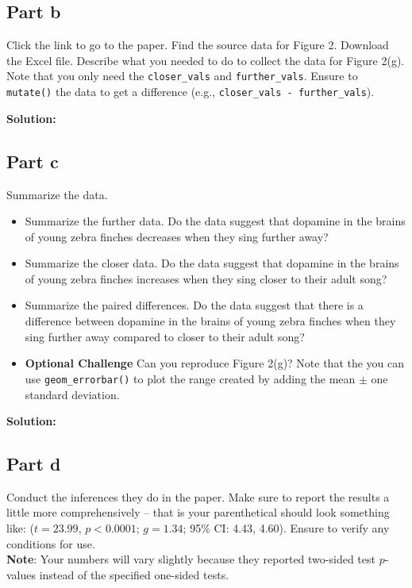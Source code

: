 \documentclass[
]{article}
\providecommand{\tightlist}{%
  \setlength{\itemsep}{0pt}\setlength{\parskip}{0pt}}
\begin{document}
\normalsize

\subsection{Part b}\label{part-b}

Click the link to go to the paper. Find the source data for Figure 2.
Download the Excel file. Describe what you needed to do to collect the
data for Figure 2(g). Note that you only need the \texttt{closer\_vals}
and \texttt{further\_vals}. Ensure to \texttt{mutate()} the data to get
a difference (e.g., \texttt{closer\_vals\ -\ further\_vals}).

\textbf{Solution:}

\subsection{Part c}\label{part-c}

Summarize the data.

\begin{itemize}
\tightlist
\item
  Summarize the further data. Do the data suggest that dopamine in the
  brains of young zebra finches decreases when they sing further away?
\item
  Summarize the closer data. Do the data suggest that dopamine in the
  brains of young zebra finches increases when they sing closer to their
  adult song?
\item
  Summarize the paired differences. Do the data suggest that there is a
  difference between dopamine in the brains of young zebra finches when
  they sing further away compared to closer to their adult song?
\item
  \textbf{Optional Challenge} Can you reproduce Figure 2(g)? Note that
  the you can use \texttt{geom\_errorbar()} to plot the range created by
  adding the mean \(\pm\) one standard deviation.
\end{itemize}

\textbf{Solution:}

\normalsize

\normalsize

\subsection{Part d}\label{part-d}

Conduct the inferences they do in the paper. Make sure to report the
results a little more comprehensively -- that is your parenthetical
should look something like: (\(t=23.99\), \(p<0.0001\); \(g=1.34\); 95\%
CI: 4.43, 4.60). Ensure to verify any conditions for use.\\
\textbf{Note}: Your numbers will vary slightly because they reported
two-sided test \(p\)-values instead of the specified one-sided tests.
\end{document}
